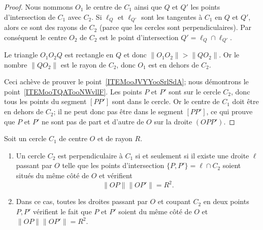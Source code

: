 \begin{proof}
	Nous nommons \( O_1\) le centre de \( C_1\) ainsi que \( Q\) et \( Q'\) les points d'intersection de \( C_1\) avec \( C_2\). Si \( \ell_Q\) et \( \ell_{Q'} \) sont les tangentes à \( C_1\) en \( Q\) et \( Q'\), alors ce sont des rayons de \( C_2\) (parce que les cercles sont perpendiculaires). Par conséquent le centre \( O_2\) de \( C_2\) est le point d'intersection \( Q'=\ell_Q\cap \ell_{Q'}\).

	Le triangle \( O_1O_2Q\) est rectangle en \( Q\) et donc \( \| O_1O_2 \|>\| QO_2 \| \). Or le nombre \( \| QO_2 \|\) est le rayon de \( C_2\), donc \( O_1\) est en dehors de \( C_2\).

	Ceci achève de prouver le point~\ref{ITEMooJVYYooSrlSdA}; nous démontrons le point~\ref{ITEMooTQATooNWvllF}. Les points \( P\) et \( P'\) sont sur le cercle \( C_2\), donc tous les points du segment \( [PP']  \) sont dans le cercle. Or le centre de \( C_1\) doit être en dehors de \( C_2\); il ne peut donc pas être dans le segment \( [PP']\), ce qui prouve que \( P\) et \( P'\) ne sont pas de part et d'autre de \( O\) sur la droite \( (OPP')\).
\end{proof}

\begin{proposition}      \label{PROPooYSVYooOFKxib}
	Soit un cercle \( C_1\) de centre \( O\) et de rayon \( R\).
	\begin{enumerate}
		\item       \label{ITEMooWYIJooAAmXUl}
		      Un cercle \( C_2\) est perpendiculaire à \( C_1\) si et seulement si il existe une droite \( \ell\) passant par \( O\) telle que les points d'intersection \( \{ P,P' \}= \ell\cap C_2\) soient situés du même côté de \( O\) et vérifient
		      \begin{equation}
			      \| OP \|\| OP' \|=R^2.
		      \end{equation}
		\item       \label{ITEMooYKZOooYZKyhF}
		      Dans ce cas, toutes les droites passant par \( O\) et coupant \( C_2\) en deux points \( P,P'\) vérifient le fait que \( P\) et \( P'\) soient du même côté de \( O\) et \( \| OP \|\| OP' \|=R^2\).
	\end{enumerate}
\end{proposition}

